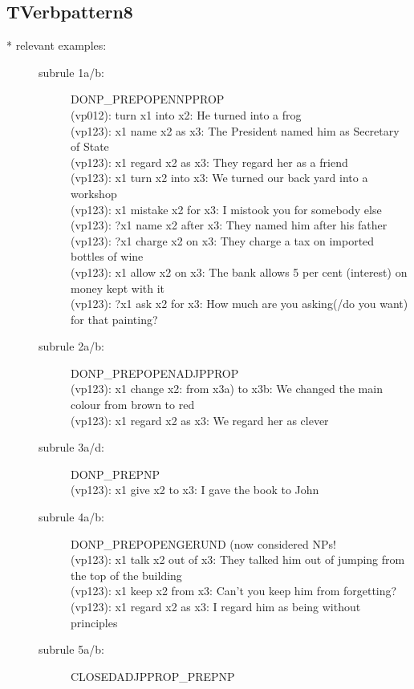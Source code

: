 \subsection{TVerbpattern8}
\begin{description}
\item[* relevant examples:] \mbox{}
\begin{description}
\item[subrule 1a/b:] DONP\_PREPOPENNPPROP\\
  (vp012): turn x1 into x2: He turned into a frog \\
  (vp123): x1 name x2 as x3: The President named him as Secretary of State\\
  (vp123): x1 regard x2 as x3: They regard her as a friend\\
  (vp123): x1 turn x2 into x3: We turned our back yard into a workshop\\
  (vp123): x1 mistake x2 for x3: I mistook you for somebody else\\
  (vp123): ?x1 name x2 after x3: They named him after his father\\
  (vp123): ?x1 charge x2 on x3: They charge a tax on imported bottles of wine\\
  (vp123): x1 allow x2 on x3: The bank allows 5 per cent (interest) on money 
kept with it\\
  (vp123): ?x1 ask x2 for x3: How much are you asking(/do you want) for that 
  painting?\\
\item[subrule 2a/b:] DONP\_PREPOPENADJPPROP\\
  (vp123): x1 change x2: from x3a) to x3b: We changed the main colour from 
brown to red\\
  (vp123): x1 regard x2 as x3: We regard her as clever\\
\item[subrule 3a/d:] DONP\_PREPNP\\
  (vp123): x1 give x2 to x3: I gave the book to John
\item[subrule 4a/b:] DONP\_PREPOPENGERUND (now considered NPs!\\
  (vp123): x1 talk x2 out of x3: They talked him out of jumping from the 
  top of the building   \\
  (vp123): x1 keep x2 from x3: Can't you keep him from forgetting?\\
  (vp123): x1 regard x2 as x3: I regard him as being without principles
\item[subrule 5a/b:] CLOSEDADJPPROP\_PREPNP\\

\end{description}
\end{description}
